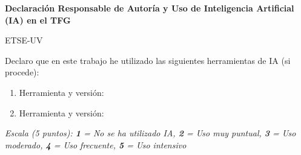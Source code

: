 
\begin{center}
  \vspace*{0.5cm}

  {\Large\textbf{\color{uv-dark}Declaración Responsable de Autoría y Uso de Inteligencia Artificial (IA) en el TFG}}

  \vspace{0.5cm}

  {\LARGE\color{uv-blue}ETSE-UV}

\end{center}


Declaro que en este trabajo he utilizado las siguientes herramientas de IA (si procede):

\begin{enumerate}
  \item Herramienta y versión: \campo{}
  \item Herramienta y versión: \campo{}
\end{enumerate}

\vspace{0.5cm}



\noindent
\textit{Escala (5 puntos): \textbf{1} = No se ha utilizado IA, \textbf{2} = Uso muy puntual, \textbf{3} = Uso moderado,  \textbf{4} = Uso frecuente, \textbf{5} = Uso intensivo}

